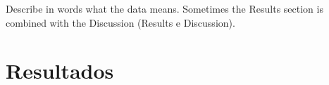 

Describe in words what the data means. Sometimes the Results section is combined with the Discussion (Results e Discussion).


\section{Resultados}
\label{resultados}